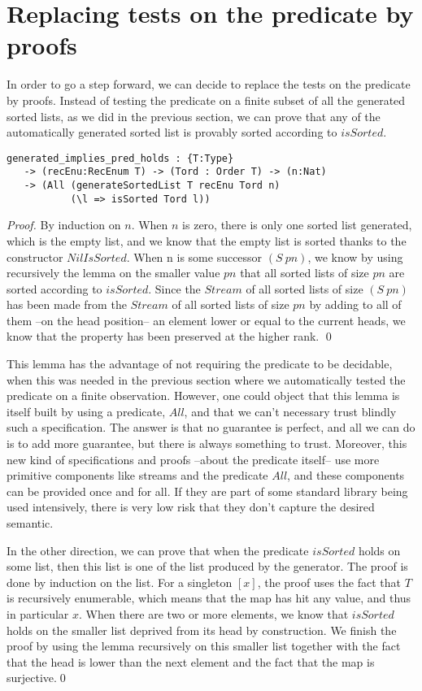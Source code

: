 \section{Replacing tests on the predicate by proofs}

\label{sect:aStepForward}

In order to go a step forward, we can decide to replace the tests on the predicate by proofs. Instead of testing the predicate on a finite subset of all the generated sorted lists, as we did in the previous section, we can prove that any of the automatically generated sorted list is provably sorted according to $isSorted$.

\begin{lstlisting}
generated_implies_pred_holds : {T:Type} 
   -> (recEnu:RecEnum T) -> (Tord : Order T) -> (n:Nat) 
   -> (All (generateSortedList T recEnu Tord n) 
           (\l => isSorted Tord l))
\end{lstlisting}
\begin{proof}
By induction on $n$.
When $n$ is zero, there is only one sorted list generated, which is the empty list, and we know that the empty list is sorted thanks to the constructor $NilIsSorted$. When n is some successor $(S\ pn)$, we know by using recursively the lemma on the smaller value $pn$ that all sorted lists of size $pn$ are sorted according to $isSorted$. Since the $Stream$ of all sorted lists of size $(S\ pn)$ has been made from the $Stream$ of all sorted lists of size $pn$ by adding to all of them --on the head position-- an element lower or equal to the current heads, we know that the property has been preserved at the higher rank.
\qed
\end{proof}

This lemma has the advantage of not requiring the predicate to be decidable, when this was needed in the previous section where we automatically tested the predicate on a finite observation. However, one could object that this lemma is itself built by using a predicate, $All$, and that we can't necessary trust blindly such a specification. The answer is that no guarantee is perfect, and all we can do is to add more guarantee, but there is always something to trust. Moreover, this new kind of specifications and proofs --about the predicate itself-- use more primitive components like streams and the predicate $All$, and these components can be provided once and for all. If they are part of some standard library being used intensively, there is very low risk that they don't capture the desired semantic.

In the other direction, we can prove that when the predicate $isSorted$ holds on some list, then this list is one of the list produced by the generator. The proof is done by induction on the list. For a singleton $[x]$, the proof uses the fact that $T$ is recursively enumerable, which means that the map has hit any value, and thus in particular $x$. When there are two or more elements, we know that $isSorted$ holds on the smaller list deprived from its head by construction. We finish the proof by using the lemma recursively on this smaller list together with the fact that the head is lower than the next element and the fact that the map is surjective.\qed
